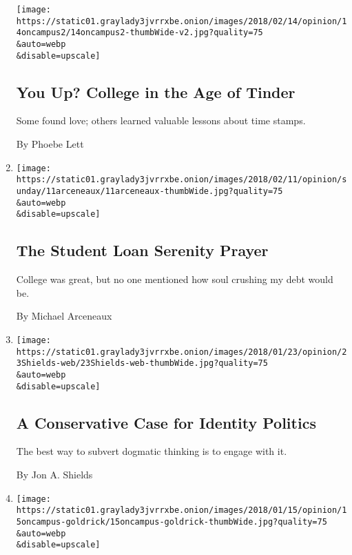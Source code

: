 \begin{enumerate}
  \texttt{[image: https://static01.graylady3jvrrxbe.onion/images/2018/02/14/opinion/14oncampus2/14oncampus2-thumbWide-v2.jpg?quality=75\\\&auto=webp\\\&disable=upscale]}

  \hypertarget{you-up-college-in-the-age-of-tinder}{%
  \subsection{You Up? College in the Age of
  Tinder}\label{you-up-college-in-the-age-of-tinder}}

  Some found love; others learned valuable lessons about time stamps.

  By Phoebe Lett
\item
  \href{/2018/02/10/opinion/sunday/student-loans-survive-emotions.html}{}

  \texttt{[image: https://static01.graylady3jvrrxbe.onion/images/2018/02/11/opinion/sunday/11arceneaux/11arceneaux-thumbWide.jpg?quality=75\\\&auto=webp\\\&disable=upscale]}

  \hypertarget{the-student-loan-serenity-prayer}{%
  \subsection{The Student Loan Serenity
  Prayer}\label{the-student-loan-serenity-prayer}}

  College was great, but no one mentioned how soul crushing my debt
  would be.

  By Michael Arceneaux
\item
  \href{/2018/01/23/opinion/conservative-identity-politics.html}{}

  \texttt{[image: https://static01.graylady3jvrrxbe.onion/images/2018/01/23/opinion/23Shields-web/23Shields-web-thumbWide.jpg?quality=75\\\&auto=webp\\\&disable=upscale]}

  \hypertarget{a-conservative-case-for-identity-politics}{%
  \subsection{A Conservative Case for Identity
  Politics}\label{a-conservative-case-for-identity-politics}}

  The best way to subvert dogmatic thinking is to engage with it.

  By Jon A. Shields
\item
  \href{/2018/01/14/opinion/hunger-college-food-insecurity.html}{}

  \texttt{[image: https://static01.graylady3jvrrxbe.onion/images/2018/01/15/opinion/15oncampus-goldrick/15oncampus-goldrick-thumbWide.jpg?quality=75\\\&auto=webp\\\&disable=upscale]}


\end{enumerate}
